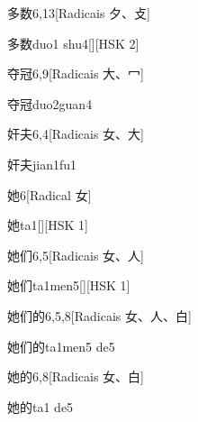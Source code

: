 \begin{entry}{多数}{6,13}[Radicais ⼣、⽁]
  \begin{phonetics}{多数}{duo1 shu4}[][HSK 2]
  \end{phonetics}
\end{entry}

\begin{entry}{夺冠}{6,9}[Radicais ⼤、⼍]
  \begin{phonetics}{夺冠}{duo2guan4}
  \end{phonetics}
\end{entry}

\begin{entry}{奸夫}{6,4}[Radicais ⼥、⼤]
  \begin{phonetics}{奸夫}{jian1fu1}
  \end{phonetics}
\end{entry}

\begin{entry}{她}{6}[Radical ⼥]
  \begin{phonetics}{她}{ta1}[][HSK 1]
  \end{phonetics}
\end{entry}

\begin{entry}{她们}{6,5}[Radicais ⼥、⼈]
  \begin{phonetics}{她们}{ta1men5}[][HSK 1]
  \end{phonetics}
\end{entry}

\begin{entry}{她们的}{6,5,8}[Radicais ⼥、⼈、⽩]
  \begin{phonetics}{她们的}{ta1men5 de5}
  \end{phonetics}
\end{entry}

\begin{entry}{她的}{6,8}[Radicais ⼥、⽩]
  \begin{phonetics}{她的}{ta1 de5}
  \end{phonetics}
\end{entry}

